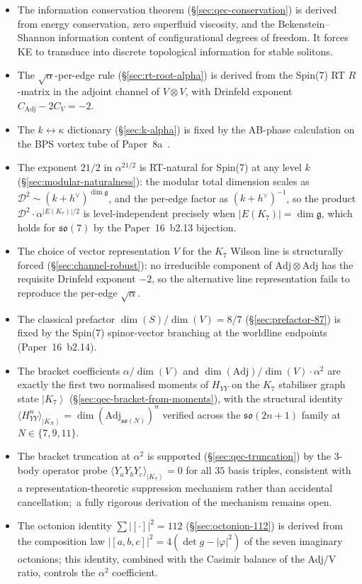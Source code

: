 \documentclass[11pt]{article}
\newcommand{\so}{\mathfrak{so}}
\newcommand{\Adj}{\mathrm{Adj}}
\newcommand{\ket}[1]{\left|#1\right\rangle}
\newcommand{\hv}{h^{\vee}}
\begin{document}
\begin{itemize}
\item The information conservation theorem
  (\S\ref{sec:qec-conservation}) is derived from energy
  conservation, zero superfluid viscosity, and the Bekenstein--
  Shannon information content of configurational degrees of
  freedom.  It forces KE to transduce into discrete topological
  information for stable solitons.
\item The $\sqrt{\alpha}$-per-edge rule (\S\ref{sec:rt-root-alpha})
  is derived from the Spin(7) RT $R$-matrix in the adjoint channel
  of $V \otimes V$, with Drinfeld exponent $C_\Adj - 2 C_V = -2$.
\item The $k \leftrightarrow \kappa$ dictionary (\S\ref{sec:k-alpha})
  is fixed by the AB-phase calculation on the BPS vortex tube of
  Paper~8a~\cite{paper8a}.
\item The exponent $21/2$ in $\alpha^{21/2}$ is RT-natural for
  Spin(7) at any level $k$ (\S\ref{sec:modular-naturalness}):
  the modular total dimension scales as
  $\mathcal{D}^2 \sim (k+\hv)^{\dim \mathfrak{g}}$, and the per-edge
  factor as $(k+\hv)^{-1}$, so the product
  $\mathcal{D}^2 \cdot \alpha^{|E(K_7)|/2}$ is level-independent
  precisely when $|E(K_7)| = \dim \mathfrak{g}$, which holds for
  $\so(7)$ by the Paper~16~b2.13 bijection.
\item The choice of vector representation $V$ for the $K_7$ Wilson
  line is structurally forced (\S\ref{sec:channel-robust}): no
  irreducible component of $\Adj \otimes \Adj$ has the requisite
  Drinfeld exponent $-2$, so the alternative line representation
  fails to reproduce the per-edge $\sqrt{\alpha}$.
\item The classical prefactor $\dim(S)/\dim(V) = 8/7$
  (\S\ref{sec:prefactor-87}) is fixed by the Spin(7) spinor-vector
  branching at the worldline endpoints (Paper~16~b2.14).
\item The bracket coefficients $\alpha/\dim(V)$ and
  $\dim(\Adj)/\dim(V)\cdot \alpha^2$ are exactly the first two
  normalised moments of $H_{YY}$ on the $K_7$ stabiliser graph state
  $\ket{K_7}$ (\S\ref{sec:qec-bracket-from-moments}), with the
  structural identity
  $\langle H_{YY}^n\rangle_{\ket{K_N}} = \dim(\Adj_{\so(N)})^n$
  verified across the $\so(2n+1)$ family at $N \in \{7,9,11\}$.
\item The bracket truncation at $\alpha^2$ is supported
  (\S\ref{sec:qec-truncation}) by the 3-body operator probe
  $\langle Y_aY_bY_c\rangle_{\ket{K_7}} = 0$ for all $35$ basis
  triples, consistent with a representation-theoretic suppression
  mechanism rather than accidental cancellation;\ a fully rigorous
  derivation of the mechanism remains open.
\item The octonion identity $\sum |[\cdot]|^2 = 112$
  (\S\ref{sec:octonion-112}) is derived from the composition law
  $|[a,b,c]|^2 = 4(\det g - |\varphi|^2)$ of the seven imaginary
  octonions; this identity, combined with the Casimir balance of
  the Adj/V ratio, controls the $\alpha^2$ coefficient.
\end{itemize}
\end{document}
